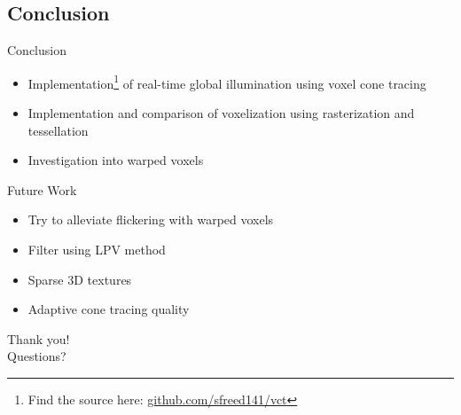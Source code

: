 \documentclass[10pt]{beamer}
\begin{document}



\subsection{Conclusion}
\begin{frame}{Conclusion}
  \begin{itemize}
    \item Implementation\footnote{Find the source here: \url{github.com/sfreed141/vct}} of real-time global illumination using voxel cone tracing
    \item Implementation and comparison of voxelization using rasterization and tessellation
    \item Investigation into warped voxels
  \end{itemize}
\end{frame}

\begin{frame}{Future Work}


  \begin{itemize}
    \item Try to alleviate flickering with warped voxels %
    \item Filter using LPV method %
    \item Sparse 3D textures %
    \item Adaptive cone tracing quality %
  \end{itemize}
\end{frame}

\begin{frame}[standout]
  \LARGE Thank you!\\
  \vspace{1cm}
  \LARGE Questions?
\end{frame}

\end{document}
